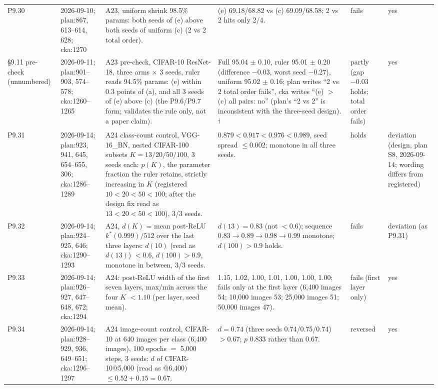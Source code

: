 \begin{longtable}{p{1.1cm}p{1.4cm}p{6.2cm}p{4.6cm}p{2.0cm}p{1.6cm}}
P9.30 & 2026-09-10; plan:867, 613--614, 628; cka:1270 & A23, uniform shrink 98.5\% params: both seeds of (e) above both seeds of uniform (c) (2 vs 2 total order). & (e) 69.18/68.82 vs (c) 69.09/68.58; 2 vs 2 hits only 2/4. & fails & yes \\
\S9.11 pre-check (unnumbered) & 2026-09-11; plan:901--903, 574--578; cka:1260--1265 & A23 pre-check, CIFAR-10 ResNet-18, three arms $\times$ 3 seeds, ruler reads 94.5\% params: (e) within 0.3 points of (a), and all 3 seeds of (e) above (c) (the P9.6/P9.7 form; validates the rule only, not a paper claim). & Full 95.04 $\pm$ 0.10, ruler 95.01 $\pm$ 0.20 (difference $-0.03$, worst seed $-0.27$), uniform 95.02 $\pm$ 0.16; plan writes ``2 vs 2 total order fails'', cka writes ``(e) $>$ (c) all pairs: no'' (plan's ``2 vs 2'' is inconsistent with the three-seed design).\textsuperscript{$\dagger$} & partly (gap $-0.03$ holds; total order fails) & yes \\
P9.31 & 2026-09-14; plan:923, 941, 645, 654--655, 306; cka:1286--1289 & A24 class-count control, VGG-16\_BN, nested CIFAR-100 subsets $K = 13/20/50/100$, 3 seeds each: $p(K)$, the parameter fraction the ruler retains, strictly increasing in $K$ (registered $10 < 20 < 50 < 100$; after the design fix read as $13 < 20 < 50 < 100$), 3/3 seeds. & $0.879 < 0.917 < 0.976 < 0.989$, seed spread $\le 0.002$; monotone in all three seeds. & holds & deviation (design, plan S8, 2026-09-14; wording differs from registered) \\
P9.32 & 2026-09-14; plan:924--925, 646; cka:1290--1293 & A24, $d(K)$ = mean post-ReLU $k^*(0.999)/512$ over the last three layers: $d(10)$ (read as $d(13)$) $< 0.6$, $d(100) > 0.9$, monotone in between, 3/3 seeds. & $d(13) = 0.83$ (not $< 0.6$); sequence $0.83 \to 0.89 \to 0.98 \to 0.99$ monotone; $d(100) > 0.9$ holds. & fails & deviation (as P9.31) \\
P9.33 & 2026-09-14; plan:926--927, 647--648, 672; cka:1294 & A24: post-ReLU width of the first seven layers, max/min across the four $K$ $< 1.10$ (per layer, seed mean). & 1.15, 1.02, 1.00, 1.01, 1.00, 1.00, 1.00; fails only at the first layer (6,400 images 54; 10,000 images 53; 25,000 images 51; 50,000 images 47). & fails (first layer only) & yes \\
P9.34 & 2026-09-14; plan:928--929, 936, 649--651; cka:1296--1297 & A24 image-count control, CIFAR-10 at 640 images per class (6,400 images), 100 epochs $=$ 5,000 steps, 3 seeds: $d$ of CIFAR-10@5,000 (read as @6,400) $\le 0.52 + 0.15 = 0.67$. & $d = 0.74$ (three seeds 0.74/0.75/0.74) $> 0.67$; $p$ 0.833 rather than 0.67. & reversed & yes \\

\end{longtable}
